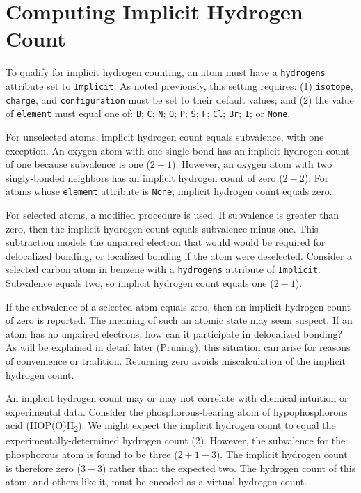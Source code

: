 \documentclass{article}
\def\ttt{\texttt}
\begin{document}
\section*{Computing Implicit Hydrogen Count}

To qualify for implicit hydrogen counting, an atom must have a \ttt{hydrogens} attribute set to \ttt{Implicit}. As noted previously, this setting requires: (1) \ttt{isotope}, \ttt{charge}, and \ttt{configuration} must be set to their default values; and (2) the value of \ttt{element} must equal one of: \ttt{B}; \ttt{C}; \ttt{N}; \ttt{O}; \ttt{P}; \ttt{S}; \ttt{F}; \ttt{Cl}; \ttt{Br}; \ttt{I}; or \ttt{None}.

For unselected atoms, implicit hydrogen count equals subvalence, with one exception. An oxygen atom with one single bond has an implicit hydrogen count of one because subvalence is one ($2 - 1$). However, an oxygen atom with two singly-bonded neighbors has an implicit hydrogen count of zero ($2 - 2$). For atoms whose \ttt{element} attribute is \ttt{None}, implicit hydrogen count equals zero.

For selected atoms, a modified procedure is used. If subvalence is greater than zero, then the implicit hydrogen count equals subvalence minus one. This subtraction models the unpaired electron that would would be required for delocalized bonding, or localized bonding if the atom were deselected. Consider a selected carbon atom in benzene with a \ttt{hydrogens} attribute of \ttt{Implicit}. Subvalence equals two, so implicit hydrogen count equals one ($2 - 1$).

If the subvalence of a selected atom equals zero, then an implicit hydrogen count of zero is reported. The meaning of such an atomic state may seem suspect. If an atom has no unpaired electrons, how can it participate in delocalized bonding? As will be explained in detail later (Pruning), this situation can arise for reasons of convenience or tradition. Returning zero avoids miscalculation of the implicit hydrogen count.

An implicit hydrogen count may or may not correlate with chemical intuition or experimental data. Consider the phosphorous-bearing atom of hypophosphorous acid (HOP(O)H\textsubscript{2}). We might expect the implicit hydrogen count to equal the experimentally-determined hydrogen count (2). However, the subvalence for the phosphorous atom is found to be three ($2 + 1 - 3$). The implicit hydrogen count is therefore zero ($3 - 3$) rather than the expected two. The hydrogen count of this atom, and others like it, must be encoded as a virtual hydrogen count.
\end{document}
